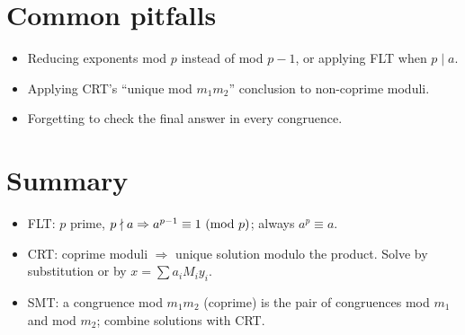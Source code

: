 \section{Common pitfalls}
\begin{itemize}
  \item Reducing exponents mod $p$ instead of mod $p-1$, or applying FLT when $p \mid a$.
  \item Applying CRT's ``unique mod $m_1m_2$'' conclusion to non-coprime moduli.
  \item Forgetting to check the final answer in every congruence.
\end{itemize}

\section{Summary}
\begin{itemize}
  \item FLT: $p$ prime, $p \nmid a \Rightarrow a^{p-1} \equiv 1 \ (\mathrm{mod}\ p)$; always $a^p \equiv a$.
  \item CRT: coprime moduli $\Rightarrow$ unique solution modulo the product. Solve by
        substitution or by $x = \sum a_iM_iy_i$.
  \item SMT: a congruence mod $m_1m_2$ (coprime) is the pair of congruences mod $m_1$ and
        mod $m_2$; combine solutions with CRT.
\end{itemize}
